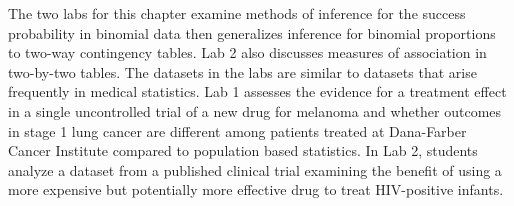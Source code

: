 The two labs for this chapter examine methods of inference for the success probability in binomial data then generalizes inference for binomial proportions to two-way contingency tables.  Lab 2 also discusses measures of association in two-by-two tables.  The datasets in the labs are similar to datasets that arise frequently in medical statistics.  Lab 1 assesses the evidence for a treatment effect in a single uncontrolled trial of a new drug for melanoma and whether outcomes in stage 1 lung cancer are different among patients treated at Dana-Farber Cancer Institute compared to population based statistics. In Lab 2, students analyze a dataset from a published clinical trial examining the benefit of using a more expensive but potentially more effective drug to treat HIV-positive infants.

